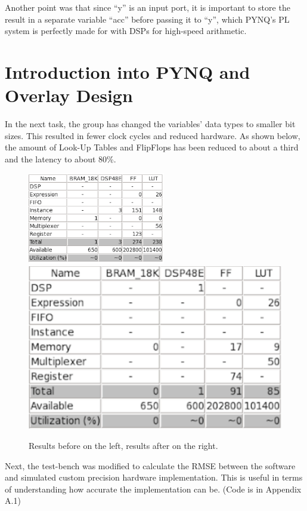 Another point was that since “y” is an input port, it is important to store the result in a separate variable “acc” before passing it to “y”, which PYNQ’s PL system is perfectly made for with DSPs for high-speed arithmetic.\cite[p.25]{crockettelliottenderwitzstewart2014}\\

\section{Introduction into PYNQ and Overlay Design}
In the next task, the group has changed the variables’ data types to smaller bit sizes. This resulted in fewer clock cycles and reduced hardware. As shown below, the amount of Look-Up Tables and FlipFlops has been reduced to about a third and the latency to about 80\%.


\begin{figure}[h]
\includegraphics[scale=1.2]{lefttable}
\includegraphics[scale=0.62]{righttable}
\caption{Results before on the left, results after on the right.}
\label{resulttable}
\end{figure}

Next, the test-bench was modified to calculate the RMSE between the software and simulated custom precision hardware implementation. This is useful in terms of understanding how accurate the implementation can be. (Code is in Appendix A.1)

